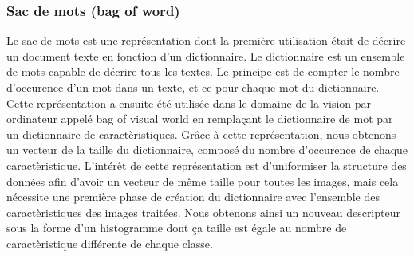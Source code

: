 \subsubsection{Sac de mots (bag of word)}
Le sac de mots est une représentation dont la première utilisation était de décrire un document texte en fonction d'un dictionnaire.
Le dictionnaire est un ensemble de mots capable de décrire tous les textes.
Le principe est de compter le nombre d'occurence d'un mot dans un texte, et ce pour chaque mot du dictionnaire. Cette représentation
a ensuite été utilisée dans le domaine de la vision par ordinateur appelé \og bag of visual world \fg\cite{BagOfWord} 
en remplaçant le dictionnaire de mot par un dictionnaire
de caractèristiques. Grâce à cette représentation, nous obtenons un vecteur de la taille du dictionnaire, composé du nombre 
d'occurence de chaque caractèristique. L'intérêt de cette représentation est d'uniformiser la structure des données
afin d'avoir un vecteur de même taille pour toutes les images, mais cela nécessite une première phase de création du dictionnaire
avec l'ensemble des caractèristiques des images traitées. Nous obtenons ainsi un nouveau descripteur sous la forme d'un
histogramme dont ça taille est égale au nombre de caractèristique différente de chaque classe.

